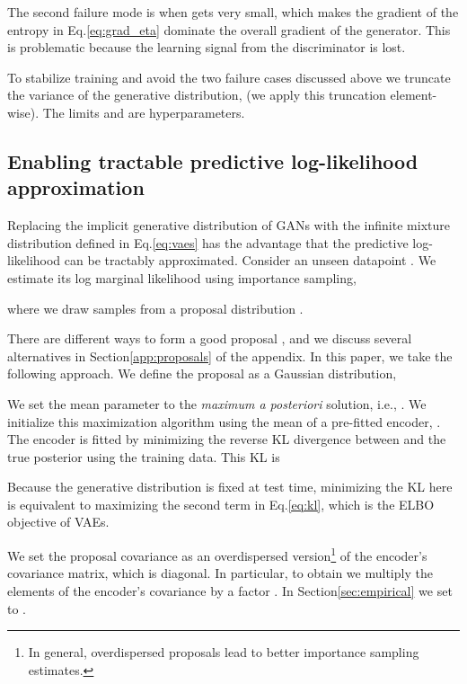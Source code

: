 \documentclass[11pt]{article}
\begin{document}
The second failure mode is when  gets very small, which makes the gradient of the entropy in Eq.\nobreakspace \ref {eq:grad_eta} dominate the overall gradient of the generator. This is problematic because the learning signal from the discriminator is lost. 

To stabilize training and avoid the two failure cases discussed above we truncate the variance of the generative distribution,
 (we apply this truncation element-wise). The limits  and  are hyperparameters.

\subsection{Enabling tractable predictive log-likelihood approximation}
\label{subsec:loglik_evaluation}

Replacing the implicit generative distribution of \glspl{GAN} with the infinite mixture distribution defined in Eq.\nobreakspace \ref {eq:vaes} has the advantage that the predictive log-likelihood can be tractably approximated. 
Consider an unseen datapoint . We estimate its log marginal likelihood  using importance sampling,

where we draw  samples  from a proposal distribution .

There are different ways to form a good proposal , and we discuss several alternatives in Section\nobreakspace \ref {app:proposals} of the appendix. In this paper, we take the following approach. We define the proposal as a Gaussian distribution,

We set the mean parameter  to the \emph{maximum a posteriori} solution, i.e., . We initialize this maximization algorithm using the mean of a pre-fitted encoder, . The encoder is fitted by minimizing the reverse \gls{KL} divergence between  and the true posterior  using the training data. This \gls{KL} is 

Because the generative distribution is fixed at test time, minimizing the \gls{KL} here is equivalent to maximizing the second term in Eq.\nobreakspace \ref {eq:kl}, which is the \gls{ELBO} objective of \glspl{VAE}.

We set the proposal covariance  as an overdispersed version\footnote{In general, overdispersed proposals lead to better importance sampling estimates.} of the encoder's covariance matrix, which is diagonal. In particular, to obtain  we multiply the elements of the encoder's covariance by a factor . In Section\nobreakspace \ref {sec:empirical} we set  to .
 
\end{document}
